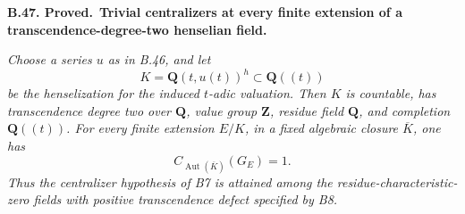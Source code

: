 \documentclass[11pt,a4paper]{article}
\newcommand{\Z}{\mathbf Z}
\newcommand{\Q}{\mathbf Q}
\newenvironment{claim}[3]{\par\medskip\noindent\hypertarget{#1}{\textbf{#1. #2.}}\ \textbf{#3.}\par\nopagebreak\smallskip\begingroup\itshape}{\endgroup\par\smallskip}
\begin{document}
\begin{claim}{B.47}{Proved}{Trivial centralizers at every finite extension of a transcendence-degree-two henselian field}
Choose a series \(u\) as in B.46, and let
\[
             K=\Q(t,u(t))^h\subset\Q((t))               \tag{B.CF.7}
\]
be the henselization for the induced \(t\)-adic valuation. Then
\(K\) is countable, has transcendence degree two over \(\Q\), value
group \(\Z\), residue field \(\Q\), and completion \(\Q((t))\).
For every finite extension \(E/K\), in a fixed algebraic closure
\(\overline K\), one has
\[
              C_{\operatorname{Aut}(\overline K)}(G_E)=1.
                                                        \tag{B.CF.8}
\]
Thus the centralizer hypothesis of B7 is attained among the
residue-characteristic-zero fields with positive transcendence defect
specified by B8.
\end{claim}
\end{document}

